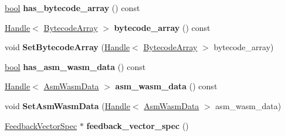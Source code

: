 \begin{DoxyCompactItemize}
\mbox{\hyperlink{classbool}{bool}} {\bfseries has\+\_\+bytecode\+\_\+array} () const
\item 
\mbox{\label{classv8_1_1internal_1_1UnoptimizedCompilationInfo_a2485c58009570f7f2ce2cdd3e9d49eb8}} 
\mbox{\hyperlink{classv8_1_1internal_1_1Handle}{Handle}}$<$ \mbox{\hyperlink{classv8_1_1internal_1_1BytecodeArray}{Bytecode\+Array}} $>$ {\bfseries bytecode\+\_\+array} () const
\item 
\mbox{\label{classv8_1_1internal_1_1UnoptimizedCompilationInfo_a06b2d875dd0a2a28f7ed09809ebe849f}} 
void {\bfseries Set\+Bytecode\+Array} (\mbox{\hyperlink{classv8_1_1internal_1_1Handle}{Handle}}$<$ \mbox{\hyperlink{classv8_1_1internal_1_1BytecodeArray}{Bytecode\+Array}} $>$ bytecode\+\_\+array)
\item 
\mbox{\label{classv8_1_1internal_1_1UnoptimizedCompilationInfo_a2470bb5e177eab3781cf1cd3a4a39b70}} 
\mbox{\hyperlink{classbool}{bool}} {\bfseries has\+\_\+asm\+\_\+wasm\+\_\+data} () const
\item 
\mbox{\label{classv8_1_1internal_1_1UnoptimizedCompilationInfo_a4dc0c034fb7ab19e2e525434152a6ee3}} 
\mbox{\hyperlink{classv8_1_1internal_1_1Handle}{Handle}}$<$ \mbox{\hyperlink{classv8_1_1internal_1_1AsmWasmData}{Asm\+Wasm\+Data}} $>$ {\bfseries asm\+\_\+wasm\+\_\+data} () const
\item 
\mbox{\label{classv8_1_1internal_1_1UnoptimizedCompilationInfo_a5503a69b59c23812b869b84f083a0cb0}} 
void {\bfseries Set\+Asm\+Wasm\+Data} (\mbox{\hyperlink{classv8_1_1internal_1_1Handle}{Handle}}$<$ \mbox{\hyperlink{classv8_1_1internal_1_1AsmWasmData}{Asm\+Wasm\+Data}} $>$ asm\+\_\+wasm\+\_\+data)
\item 
\mbox{\label{classv8_1_1internal_1_1UnoptimizedCompilationInfo_a576cd29fda00ea2db479762def9cdf27}} 
\mbox{\hyperlink{classv8_1_1internal_1_1FeedbackVectorSpec}{Feedback\+Vector\+Spec}} $\ast$ {\bfseries feedback\+\_\+vector\+\_\+spec} ()
\end{DoxyCompactItemize}


